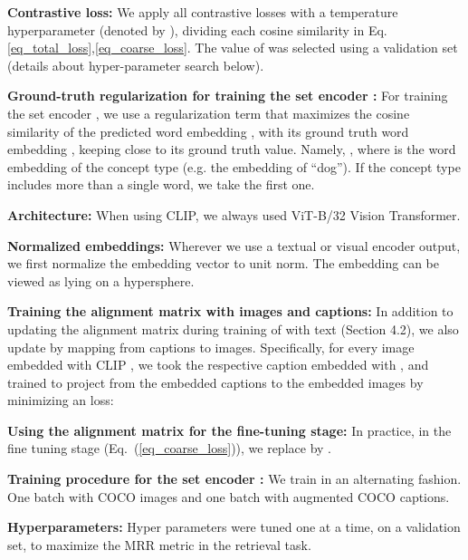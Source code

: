 \documentclass[runningheads]{llncs}
\renewcommand{\eqref}[1]{Eq.~(\ref{#1})}
\begin{document}
\vspace{15pt}\noindent\textbf{Contrastive loss:} We apply all contrastive losses with a temperature hyperparameter (denoted by ), dividing each cosine similarity in Eq.\ref{eq_total_loss},\ref{eq_coarse_loss}. The value of  was selected using a validation set (details about hyper-parameter search below).




\vspace{15pt}\noindent\textbf{Ground-truth regularization for training the set encoder :}
For training the set encoder , we use a regularization term that maximizes the cosine similarity of the predicted word embedding , with its ground truth word embedding , keeping  close to its ground truth value.
Namely, , where  is the word embedding of the concept type  (e.g. the embedding of  ``dog''). If the concept type includes more than a single word, we take the first one.

\vspace{15pt}\noindent\textbf{Architecture:} When using CLIP, we always used  ViT-B/32 Vision Transformer.

\vspace{15pt}\noindent\textbf{Normalized embeddings:}
Wherever we use a textual or visual encoder output, we first normalize the embedding vector to unit norm. The embedding can be viewed as lying on a hypersphere.


\vspace{15pt}\noindent\textbf{Training the alignment matrix  with images and captions:}
In addition to updating the alignment matrix  during training of  with text (Section 4.2), we also update  by mapping from captions to images.
Specifically, for every image  embedded with CLIP , we took the respective caption  embedded with , and trained  to project from the embedded captions to the embedded images by minimizing an  loss:

\small



\vspace{15pt}\noindent\textbf{Using the alignment matrix  for the fine-tuning stage:} 
In practice, in the  fine tuning stage (\eqref{eq_coarse_loss}), we replace  by .


\vspace{15pt}\noindent\textbf{Training procedure for the set encoder :}
We train  in an alternating fashion. One batch with COCO images and one batch with augmented COCO captions.

\vspace{15pt}\noindent\textbf{Hyperparameters:}
Hyper parameters were tuned one at a time, on a validation set, to maximize the MRR metric in the retrieval task.
\end{document}
